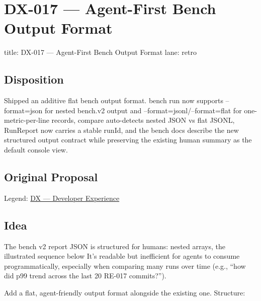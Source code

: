 \chapter{DX-017 --- Agent-First Bench Output Format}\label{record-324}

\smallskip

\begin{RecordMeta}
title: DX-017 — Agent-First Bench Output Format
lane: retro

\end{RecordMeta}

\section{Disposition}\label{record-324-disposition}

Shipped an additive flat bench output format. bench run now supports --format=json for nested bench.v2 output and --format=jsonl/--format=flat for one-metric-per-line records, compare auto-detects nested JSON vs flat JSONL, RunReport now carries a stable runId, and the bench docs describe the new structured output contract while preserving the existing human summary as the default console view.

\section{Original Proposal}\label{record-324-original-proposal}

Legend: \href{https://github.com/flyingrobots/bijou/blob/1853ad902f6bf219326409e7f743a5a1d6517dbc/docs/method/legends/DX-developer-experience.md}{DX --- Developer Experience}

\section{Idea}\label{record-324-idea}

The bench v2 report JSON is structured for humans: nested arrays, the illustrated sequence below It's readable but inefficient for agents to consume programmatically, especially when comparing many runs over time (e.g., ``how did p99 trend across the last 20 RE-017 commits?'').



Add a flat, agent-friendly output format alongside the existing one. Structure:

